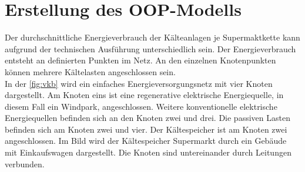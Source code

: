 
\section{Erstellung des OOP-Modells}

Der durchschnittliche Energieverbrauch der Kälteanlagen je Supermaktkette
kann aufgrund der technischen Ausführung unterschiedlich sein. Der
Energieverbrauch entsteht an definierten Punkten im Netz. An den einzelnen
Knotenpunkten können mehrere Kältelasten angeschlossen sein.\\

In der \cref{fig:vkb} wird ein einfaches Energieversorgungsnetz mit vier Knoten
dargestellt. Am Knoten eins ist eine regenerative elektrische Energiequelle, in
diesem Fall ein Windpark, angeschlossen. Weitere konventionelle elektrische
Energiequellen befinden sich an den Knoten zwei und drei. Die passiven Lasten
befinden sich am Knoten zwei und vier. Der Kältespeicher ist am Knoten zwei
angeschlossen. Im Bild wird der Kältespeicher Supermarkt durch ein Geb\"aude
mit Einkaufswagen dargestellt. Die Knoten sind untereinander durch Leitungen
verbunden.

